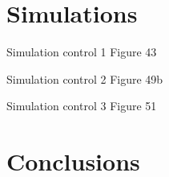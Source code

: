 \section{Simulations}
\begin{frame}{Simulation control 1}
  Figure 43
\end{frame}

\begin{frame}{Simulation control 2}
  Figure 49b
\end{frame}

\begin{frame}{Simulation control 3}
  Figure 51
\end{frame}

                                                      
\section{Conclusions}

